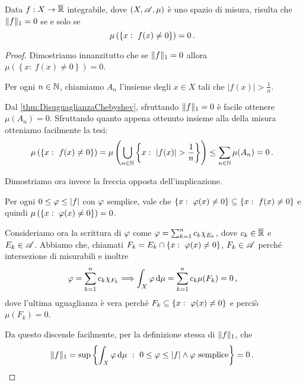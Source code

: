 \begin{lemma}\label{lemma:L1NullaAlloraNulla}
	Data $f:X\to\overline{\mathbb R}$ integrabile, dove $(X,\mathscr A,\mu)$ è uno spazio di misura, risulta che $\Vert f\Vert_1=0$ se e solo se
	\begin{equation*}
		\mu\left(\left\{x:\ f(x)\not=0\right\}\right)=0\punto
	\end{equation*}
\end{lemma}
\begin{proof}
	Dimostriamo innanzitutto che se $\Vert f\Vert_1=0$ allora $\mu\left(\left\{x:\ f(x)\not=0\right\}\right)=0$.

	Per ogni $n\in\mathbb N$, chiamiamo $A_n$ l'insieme degli $x\in X$ tali che $|f(x)|>\frac 1n$.
	
	Dal \cref{thm:DisuguaglianzaChebyshev}, sfruttando $\Vert f\Vert_1=0$ è facile ottenere $\mu(A_n)=0$. 
	Sfruttando quanto appena ottenuto insieme alla \sigsubadd[ità] della misura otteniamo facilmente la tesi:
	\begin{equation*}
		\mu\left(\left\{x:\ f(x)\not=0\right\}\right)=\mu\left(\bigcup_{n\in\N}\left\{x:\ |f(x)|>\frac1n\right\}\right)\le\sum_{n\in\N}\mu(A_n)=0\punto
	\end{equation*}
	
	Dimostriamo ora invece la freccia opposta dell'implicazione.
	
	Per ogni $0\le \varphi \le |f|$ con $\varphi$ semplice, vale che $\left\{x:\ \simp(x)\not=0\right\}\subseteq\left\{x:\ f(x)\not=0\right\}$ e quindi $\mu\left(\left\{x:\ \simp(x)\not=0\right\}\right)=0$. 
	
	Consideriamo ora la scrittura di $\varphi$ come $\varphi=\sum_{k=1}^n c_k\chi_{E_k}$, dove $c_k\in\overline{\mathbb R}$ e $E_k\in\mathscr A$. Abbiamo che, chiamati $F_k=E_k\cap \left\{x:\ \simp(x)\not=0\right\}$, $F_k\in\mathscr A$ perché intersezione di misurabili e inoltre 
	\begin{equation*}
		\varphi=\sum_{k=1}^n c_k\chi_{F_k} \Longrightarrow \int_X\varphi\,\mathrm d\mu=\sum_{k=1}^n c_k\mu(F_k)=0\, \text{, }
	\end{equation*}
	dove l'ultima uguaglianza è vera perché $F_k\subseteq \left\{x:\ \simp(x)\not=0\right\}$ e perciò $\mu(F_k)=0$.
	
	Da questo discende facilmente, per la definizione stessa di $\Vert f\Vert_1$, che
	\begin{equation*}
		\Vert f\Vert_1=\sup\left\{ \int_X \varphi\,\mathrm d\mu\ :\ 0\le \varphi \le |f| \wedge \varphi \text{ semplice}\right\}=0\, \text{. }
	\end{equation*}
\end{proof}

